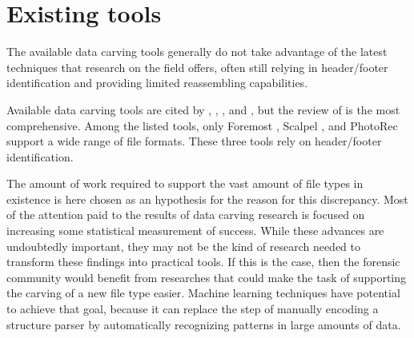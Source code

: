 \section{Existing tools}
The available data carving tools generally do not take advantage of the latest techniques that research on the field offers, often still relying in header/footer identification and providing limited reassembling capabilities.


Available data carving tools are cited by \cite{ali_review_2018}, \cite{qiu_new_2014}, \cite{nadeem_ashraf_forensic_2013}, and \cite{roux_reconstructing_2008}, but the review of \cite{ali_review_2018} is the most comprehensive. Among the listed tools, only Foremost \cite{kendall_notitle_2010}, Scalpel \cite{richard_iii_scalpel:_2005}, and PhotoRec \cite{grenier_photorec_2011} support a wide range of file formats. These three tools rely on header/footer identification.

The amount of work required to support the vast amount of file types in existence is here chosen as an hypothesis for the reason for this discrepancy. Most of the attention paid to the results of data carving research is focused on increasing some statistical measurement of success. While these advances are undoubtedly important, they may not be the kind of research needed to transform these findings into practical tools. If this is the case, then the forensic community would benefit from researches that could make the task of supporting the carving of a new file type easier. Machine learning techniques have potential to achieve that goal, because it can replace the step of manually encoding a structure parser by automatically recognizing patterns in large amounts of data.
